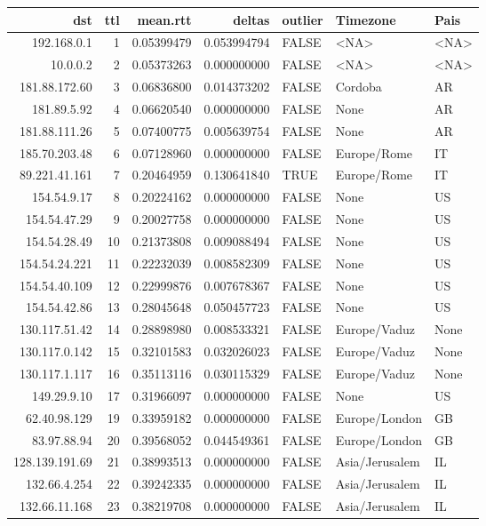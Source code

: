 \documentclass[11pt]{article}
\author{nsm}
\date{\today}
\title{}
\begin{document}
\tableofcontents

\begin{center}
\begin{tabular}{rrrrlll}
dst & ttl & mean.rtt & deltas & outlier & Timezone & Pais\\
\hline
192.168.0.1 & 1 & 0.05399479 & 0.053994794 & FALSE & <NA> & <NA>\\
10.0.0.2 & 2 & 0.05373263 & 0.000000000 & FALSE & <NA> & <NA>\\
181.88.172.60 & 3 & 0.06836800 & 0.014373202 & FALSE & Cordoba & AR\\
181.89.5.92 & 4 & 0.06620540 & 0.000000000 & FALSE & None & AR\\
181.88.111.26 & 5 & 0.07400775 & 0.005639754 & FALSE & None & AR\\
185.70.203.48 & 6 & 0.07128960 & 0.000000000 & FALSE & Europe/Rome & IT\\
89.221.41.161 & 7 & 0.20464959 & 0.130641840 & TRUE & Europe/Rome & IT\\
154.54.9.17 & 8 & 0.20224162 & 0.000000000 & FALSE & None & US\\
154.54.47.29 & 9 & 0.20027758 & 0.000000000 & FALSE & None & US\\
154.54.28.49 & 10 & 0.21373808 & 0.009088494 & FALSE & None & US\\
154.54.24.221 & 11 & 0.22232039 & 0.008582309 & FALSE & None & US\\
154.54.40.109 & 12 & 0.22999876 & 0.007678367 & FALSE & None & US\\
154.54.42.86 & 13 & 0.28045648 & 0.050457723 & FALSE & None & US\\
130.117.51.42 & 14 & 0.28898980 & 0.008533321 & FALSE & Europe/Vaduz & None\\
130.117.0.142 & 15 & 0.32101583 & 0.032026023 & FALSE & Europe/Vaduz & None\\
130.117.1.117 & 16 & 0.35113116 & 0.030115329 & FALSE & Europe/Vaduz & None\\
149.29.9.10 & 17 & 0.31966097 & 0.000000000 & FALSE & None & US\\
62.40.98.129 & 19 & 0.33959182 & 0.000000000 & FALSE & Europe/London & GB\\
83.97.88.94 & 20 & 0.39568052 & 0.044549361 & FALSE & Europe/London & GB\\
128.139.191.69 & 21 & 0.38993513 & 0.000000000 & FALSE & Asia/Jerusalem & IL\\
132.66.4.254 & 22 & 0.39242335 & 0.000000000 & FALSE & Asia/Jerusalem & IL\\
132.66.11.168 & 23 & 0.38219708 & 0.000000000 & FALSE & Asia/Jerusalem & IL\\
\end{tabular}
\end{center}
\end{document}
